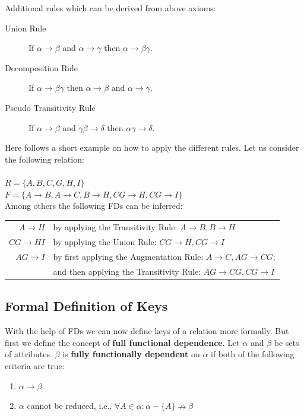 \noindent Additional rules which can be derived from above axioms:

\begin{description}
  \item[Union Rule] If $\alpha \rightarrow \beta$ and $\alpha \rightarrow \gamma$ then $\alpha \rightarrow \beta\gamma$.
  \item[Decomposition Rule] If $\alpha \rightarrow \beta\gamma$ then $\alpha \rightarrow \beta$ and $\alpha \rightarrow \gamma$.
  \item[Pseudo Transitivity Rule] If $\alpha \rightarrow \beta$ and $\gamma\beta \rightarrow \delta$ then $\alpha\gamma \rightarrow \delta$.
\end{description}

Here follows a short example on how to apply the different rules. 
Let us consider the following relation:\\ \\
\indent $R = \{A, B, C, G, H, I\}$ \\
\indent $F = \{A \rightarrow B, A \rightarrow C, B \rightarrow H, CG \rightarrow H, CG \rightarrow I\} $ \\

Among others the following FDs can be inferred:\\
\indent \begin{tabular}[h]{r l}
  $A \rightarrow H$ & by applying the Transitivity Rule: $A \rightarrow B, B \rightarrow H$ \\
  $CG \rightarrow HI$ & by  applying the Union Rule: $CG \rightarrow H, CG \rightarrow I$ \\
  $AG \rightarrow I$ & by first applying the Augmentation Rule: $A \rightarrow C, AG \rightarrow CG$; \\
  $ $ & and then applying the Transitivity Rule: $AG \rightarrow CG, CG \rightarrow I$
\end{tabular}

\subsection{Formal Definition of Keys}
With the help of FDs we can now define keys of a relation more formally. 
But first we define 
the concept of \textbf{full functional dependence}. 
Let $\alpha$ and $\beta$ be sets of attributes.
$\beta$ is \textbf{fully functionally dependent} on $\alpha$ if both of the following criteria are true:
\begin{enumerate}
  \item $\alpha \rightarrow \beta$
  \item $\alpha$ cannot be reduced, i.e., $\forall A \in \alpha : \alpha - \{A\} \nrightarrow \beta$ 
\end{enumerate}
 

